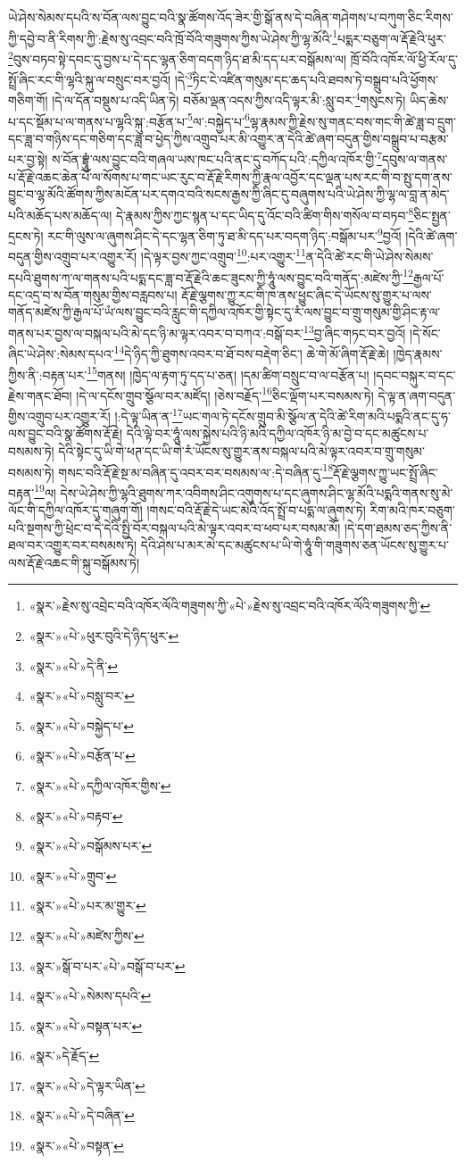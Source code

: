 ཡེ་ཤེས་སེམས་དཔའི་ས་བོན་ལས་བྱུང་བའི་སྣ་ཚོགས་འོད་ཟེར་གྱི་སྒོ་ནས་དེ་བཞིན་གཤེགས་པ་བཀུག་ཅིང་རིགས་ཀྱི་དབྱེ་བ་ནི་རིགས་ཀྱི་:རྗེས་སུ་འབྲང་བའི་ཁྲོ་བོའི་གཟུགས་ཀྱིས་ཡེ་ཤེས་ཀྱི་ལྷ་མོའི་\footnote{«སྣར་»རྗེས་སུ་འབྲེང་བའི་འཁོར་ལོའི་གཟུགས་ཀྱི་«པེ་»རྗེས་སུ་འབྲང་བའི་འཁོར་ལོའི་གཟུགས་ཀྱི་}པདྨར་བཅུག་ལ་རྡོ་རྗེའི་ཕུར་\footnote{«སྣར་»«པེ་»ཕུར་བུའི་དེ་ཉིད་ཕུར་}བུས་བཏབ་སྟེ་དབང་དུ་བྱས་པ་དེ་དང་ལྷན་ཅིག་བདག་ཉིད་ཐ་མི་དད་པར་བསྒོམས་ལ། ཁྲོ་བོའི་འཁོར་ལོ་ཕྱི་རོལ་དུ་སྤྲོ་ཞིང་རང་གི་ལྷའི་སྐུ་ལ་བསྲུང་བར་བྱའོ། །དེ་\footnote{«སྣར་»«པེ་»དེ་ནི་}ཏིང་ངེ་འཛིན་གསུམ་དང་ཆད་པའི་ཐབས་ཏེ་བསྒྲུབ་པའི་ཕྱོགས་གཅིག་གོ། །དེ་ལ་དོན་བསྡུས་པ་འདི་ཡིན་ཏེ། བཅོམ་ལྡན་འདས་ཀྱིས་འདི་ལྟར་མི་:སླུ་བར་\footnote{«སྣར་»«པེ་»བསླུ་བར་}གསུངས་ཏེ། ཡིད་ཆེས་པ་དང་སྡོམ་པ་ལ་གནས་པ་ལྷའི་སྐུ་:བརྩོན་པ་\footnote{«སྣར་»«པེ་»བསྐྱེད་པ་}ལ་:བསྐྱེད་པ་\footnote{«སྣར་»«པེ་»བརྩོན་པ་}ལྷ་རྣམས་ཀྱི་རྗེས་སུ་གནང་བས་གང་གི་ཚེ་ཟླ་བ་དྲུག་དང་ཟླ་བ་གཉིས་དང་གཅིག་དང་ཟླ་བ་ཕྱེད་ཀྱིས་འགྲུབ་པར་མི་འགྱུར་ན་དེའི་ཚེ་ཞག་བདུན་གྱིས་བསྒྲུབ་པ་བརྩམ་པར་བྱ་སྟེ། ས་བོན་བྷྲཱུཾ་ལས་བྱུང་བའི་གཞལ་ཡས་ཁང་པའི་ནང་དུ་བཀོད་པའི་:དཀྱིལ་འཁོར་གྱི་\footnote{«སྣར་»«པེ་»དཀྱིལ་འཁོར་གྱིས་}དབུས་ལ་གནས་པ་རྡོ་རྗེ་འཆང་ཆེན་པོ་ལ་སོགས་པ་གང་ཡང་རུང་བ་རྡོ་རྗེ་རིགས་ཀྱི་རྣལ་འབྱོར་དང་ལྡན་པས་རང་གི་བ་སྤུ་དག་ནས་བྱུང་བ་ལྷ་མོའི་ཚོགས་ཀྱིས་མངོན་པར་དགའ་བའི་སངས་རྒྱས་ཀྱི་ཞིང་དུ་བཞུགས་པའི་ཡེ་ཤེས་ཀྱི་ལྷ་ལ་བླ་ན་མེད་པའི་མཆོད་པས་མཆོད་ལ། དེ་རྣམས་ཀྱིས་ཀྱང་སྙན་པ་དང་ཡིད་དུ་འོང་བའི་ཚིག་གིས་གསོལ་བ་བཏབ་\footnote{«སྣར་»«པེ་»བརྟབ་}ཅིང་སྤྱན་དྲངས་ཏེ། རང་གི་ལུས་ལ་ཞུགས་ཤིང་དེ་དང་ལྷན་ཅིག་ཏུ་ཐ་མི་དད་པར་བདག་ཉིད་:བསྒོམ་པར་\footnote{«སྣར་»«པེ་»བསྒོམས་པར་}བྱའོ། །དེའི་ཚེ་ཞག་བདུན་གྱིས་འགྲུབ་པར་འགྱུར་རོ། །དེ་ལྟར་བྱས་ཀྱང་འགྲུབ་\footnote{«སྣར་»«པེ་»གྲུབ་}:པར་འགྱུར་\footnote{«སྣར་»«པེ་»པར་མ་གྱུར་}ན་དེའི་ཚེ་རང་གི་ཡེ་ཤེས་སེམས་དཔའི་ཐུགས་ཀ་ལ་གནས་པའི་པདྨ་དང་ཟླ་བ་རྡོ་རྗེའི་ཆང་ཟུངས་ཀྱི་ཧཱུཾ་ལས་བྱུང་བའི་གནོད་:མཛེས་ཀྱི་\footnote{«སྣར་»«པེ་»མཛེས་ཀྱིས་}རྒྱལ་པོ་དང་འདྲ་བ་ས་བོན་གསུམ་གྱིས་བརླབས་པ། རྡོ་རྗེ་ལྕགས་ཀྱུ་རང་གི་ཁ་ནས་ཕྱུང་ཞིང་དེ་ཡོངས་སུ་གྱུར་པ་ལས་གནོད་མཛེས་ཀྱི་རྒྱལ་པོ་ཡཾ་ལས་བྱུང་བའི་རླུང་གི་དཀྱིལ་འཁོར་གྱི་སྟེང་དུ་རཾ་ལས་བྱུང་བ་གྲུ་གསུམ་གྱི་ཤིང་རྟ་ལ་གནས་པར་བྱས་ལ་བསྐལ་པའི་མེ་དང་ཉི་མ་ལྟར་འབར་བ་བཀའ་:བསྒོ་བར་\footnote{«སྣར་»སྒོ་བ་པར་«པེ་»བསྒོ་བ་པར་}བྱ་ཞིང་གཏང་བར་བྱའོ། །དེ་སོང་ཞིང་ཡེ་ཤེས་:སེམས་དཔའ་\footnote{«སྣར་»«པེ་»སེམས་དཔའི་}དེ་ཉིད་ཀྱི་ཐུགས་འབར་བ་ཐོ་བས་བརྡེག་ཅིང་། ཆེ་གེ་མོ་ཞིག་རྡོ་རྗེ་ཆེ། །ཁྱེད་རྣམས་ཀྱིས་ནི་:བརྟན་པར་\footnote{«སྣར་»«པེ་»བསྟན་པར་}གནས། །ཁྱེད་ལ་རྟག་ཏུ་དད་པ་ཅན། །དམ་ཚིག་བསྲུང་བ་ལ་བརྩོན་པ། །དབང་བསྐུར་བ་དང་རྗེས་གནང་ཐོབ། །དེ་ལ་དངོས་གྲུབ་སྩོལ་བར་མཛོད། །ཅེས་བརྗོད་\footnote{«སྣར་»དེ་རྗོད་}ཅིང་ལྡོག་པར་བསམས་ཏེ། དེ་ལྟ་ན་ཞག་བདུན་གྱིས་འགྲུབ་པར་འགྱུར་རོ། །:དེ་ལྟ་ཡིན་ན་\footnote{«སྣར་»«པེ་»དེ་ལྟར་ཡིན་}ཡང་གལ་ཏེ་དངོས་གྲུབ་མི་སྩོལ་ན་དེའི་ཚེ་རིག་མའི་པདྨའི་ནང་དུ་ཧ་ལས་བྱུང་བའི་སྣ་ཚོགས་རྡོ་རྗེ། དེའི་ལྟེ་བར་ཧཱུཾ་ལས་སྐྱེས་པའི་ཉི་མའི་དཀྱིལ་འཁོར་ཉི་མ་བྱེ་བ་དང་མཚུངས་པ་བསམས་ཏེ། དེའི་སྟེང་དུ་ཡི་གེ་ཕཊ་དང་ཡི་གེ་རཾ་ཡོངས་སུ་གྱུར་ནས་བསྐལ་པའི་མེ་ལྟར་འབར་བ་གྲུ་གསུམ་བསམས་ཏེ། གསང་བའི་རྡོ་རྗེ་སྔ་མ་བཞིན་དུ་འབར་བར་བསམས་ལ་:དེ་བཞིན་དུ་\footnote{«སྣར་»«པེ་»དེ་བཞིན་}རྡོ་རྗེ་ལྕགས་ཀྱུ་ཡང་སྤྲོ་ཞིང་བརྟན་\footnote{«སྣར་»«པེ་»བསྟན་}ལ། དེས་ཡེ་ཤེས་ཀྱི་ལྷའི་ཐུགས་ཀར་འབིགས་ཤིང་འགུགས་པ་དང་ཞུགས་ཤིང་ལྷ་མོའི་པདྨའི་གནས་སུ་མེ་ལོང་གི་དཀྱིལ་འཁོར་དུ་གཞུག་གོ། །གསང་བའི་རྡོ་རྗེ་དེ་ཡང་མེའི་འོད་སྤྲོ་བ་པདྨ་ལ་ཞུགས་ཏེ། རིག་མའི་ཁར་བཅུག་པའི་སྔགས་ཀྱི་ཕྲེང་བ་དེ་དེའི་སྤྱི་བོར་བསྐལ་པའི་མེ་ལྟར་འབར་བ་ཕབ་པར་བསམ་མོ། །དེ་དག་ཐམས་ཅད་ཀྱིས་ནི་ཐལ་བར་འགྱུར་བར་བསམས་ཏེ། དེའི་ཤེས་པ་མར་མེ་དང་མཚུངས་པ་ཡི་གེ་ཧཱུཾ་གི་གཟུགས་ཅན་ཡོངས་སུ་གྱུར་པ་ལས་རྡོ་རྗེ་འཆང་གི་སྐུ་བསྒོམས་ཏེ། 